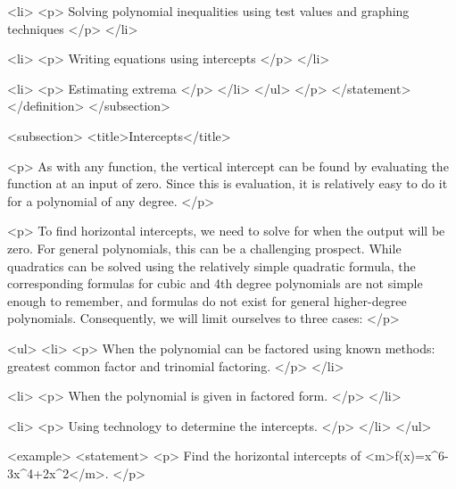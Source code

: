                         <li>
                            <p>
                                Solving polynomial inequalities using test values and graphing techniques
                            </p>
                        </li>

                        <li>
                            <p>
                                Writing equations using intercepts
                            </p>
                        </li>

                        <li>
                            <p>
                                Estimating extrema
                            </p>
                        </li>
                    </ul>
                </p>
            </statement>
        </definition>
    </subsection>


    <subsection>
        <title>Intercepts</title>

        <p>
            As with any function, the vertical intercept can be found by evaluating the function at an input of zero.
            Since this is evaluation, it is relatively easy to do it for a polynomial of any degree.
        </p>

        <p>
            To find horizontal intercepts, we need to solve for when the output will be zero.
            For general polynomials, this can be a challenging prospect.
            While quadratics can be solved using the relatively simple quadratic formula, the corresponding formulas for cubic and 4th degree polynomials are not simple enough to remember, and formulas do not exist for general higher-degree polynomials.
            Consequently, we will limit ourselves to three cases:
        </p>

        <ul>
            <li>
                <p>
                    When the polynomial can be factored using known methods: greatest common factor and trinomial factoring.
                </p>
            </li>

            <li>
                <p>
                    When the polynomial is given in factored form.
                </p>
            </li>

            <li>
                <p>
                    Using technology to determine the intercepts.
                </p>
            </li>
        </ul>

        <example>
            <statement>
                <p>
                    Find the horizontal intercepts of <m>f(x)=x^{6}-3x^{4}+2x^{2}</m>.
                </p>

